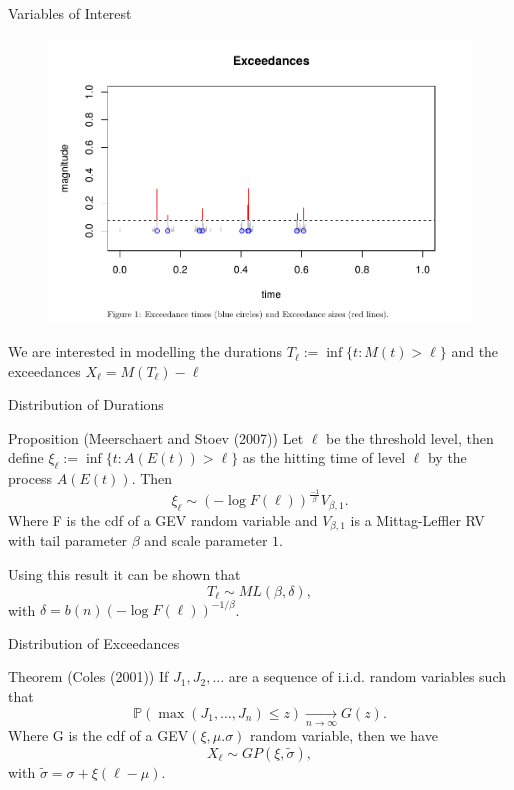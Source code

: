 \documentclass{beamer}
\newcommand{\Prob}{\mathbb{P}}
\begin{document}
\begin{frame}{Variables of Interest}

    \begin{figure}
        \centering
        \vspace{-0.5cm}
        \hspace{-0cm}
        \includegraphics[scale=0.3]{Exceedances.png}
    \end{figure}
    We are interested in modelling the durations $T_\ell := \inf\{t: M(t) > \ell\}$ and the exceedances $X_\ell=M(T_\ell)-\ell$    
\end{frame}



\begin{frame}{Distribution of Durations}
    \begin{block}{Proposition (Meerschaert and Stoev (2007))}
         Let $\ell$ be the threshold level, then define $\xi_\ell := \inf\{t: A(E(t)) > \ell\}$ as the hitting time of level
	$\ell$ by the process $A(E(t))$. Then
        \[
            \xi_\ell \sim (-\log F(\ell))^{\frac{-1}{\beta}}V_{\beta,1}.
        \]
        Where F is the cdf of a GEV random variable and $V_{\beta,1}$ is a Mittag-Leffler RV with tail parameter $\beta$ and scale parameter $1$.
        \end{block}
        Using this result it can be shown that 
        \[
            T_\ell \sim ML(\beta,\delta),
        \]
        with $\delta=b(n)(-\log F(\ell))^{-1/\beta}$.

    
\end{frame}

\begin{frame}{Distribution of Exceedances}
    \begin{block}{Theorem (Coles (2001))}
         If $J_1,J_2,\ldots$ are a sequence of i.i.d. random variables such that
        \[
            \Prob(\max(J_1,\ldots,J_n)\leq z)\xrightarrow[n\to\infty]{}G(z).
        \]
        Where G is the cdf of a GEV$(\xi,\mu.\sigma)$ random variable, then we have
        \[
            X_\ell \sim GP(\xi,\tilde{\sigma}),
        \]
        with $\tilde{\sigma}=\sigma+\xi(\ell-\mu)$.
    \end{block}
\end{frame}
\end{document}
